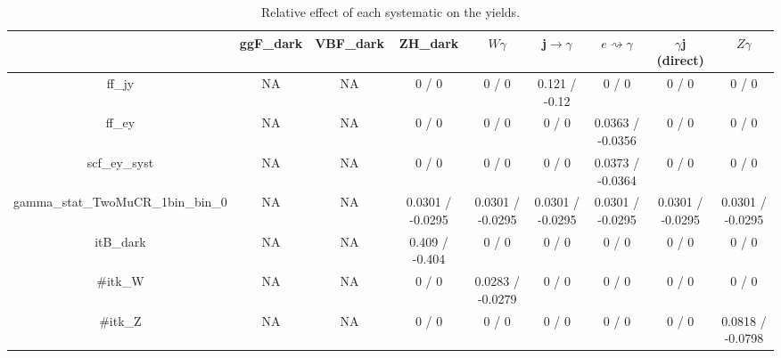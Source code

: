 \documentclass[10pt]{article}
\begin{document}
\begin{table}[htbp]
\begin{center}
\begin{tabular}{|c|c|c|c|c|c|c|c|c|}
\hline 
      & ggF_{dark}      & VBF_{dark}      & ZH_{dark}      & $W\gamma$      & j$\rightarrow\gamma$      & $e\rightsquigarrow\gamma$      & $\gamma$j (direct)      & $Z\gamma$ \\ 
\hline 
  ff_jy &    NA    &    NA    & 0 / 0 & 0 / 0 & 0.121 / -0.12 & 0 / 0 & 0 / 0 & 0 / 0 \\ 
  ff_ey &    NA    &    NA    & 0 / 0 & 0 / 0 & 0 / 0 & 0.0363 / -0.0356 & 0 / 0 & 0 / 0 \\ 
  scf_ey_syst &    NA    &    NA    & 0 / 0 & 0 / 0 & 0 / 0 & 0.0373 / -0.0364 & 0 / 0 & 0 / 0 \\ 
  gamma_stat_TwoMuCR_1bin_bin_0 &    NA    &    NA    & 0.0301 / -0.0295 & 0.0301 / -0.0295 & 0.0301 / -0.0295 & 0.0301 / -0.0295 & 0.0301 / -0.0295 & 0.0301 / -0.0295 \\ 
  it{B}_{dark} &    NA    &    NA    & 0.409 / -0.404 & 0 / 0 & 0 / 0 & 0 / 0 & 0 / 0 & 0 / 0 \\ 
  #it{k_{W}} &    NA    &    NA    & 0 / 0 & 0.0283 / -0.0279 & 0 / 0 & 0 / 0 & 0 / 0 & 0 / 0 \\ 
  #it{k_{Z}} &    NA    &    NA    & 0 / 0 & 0 / 0 & 0 / 0 & 0 / 0 & 0 / 0 & 0.0818 / -0.0798 \\ 
\hline 
\end{tabular} 
\caption{Relative effect of each systematic on the yields.} 
\end{center} 
\end{table} 
\end{document}
